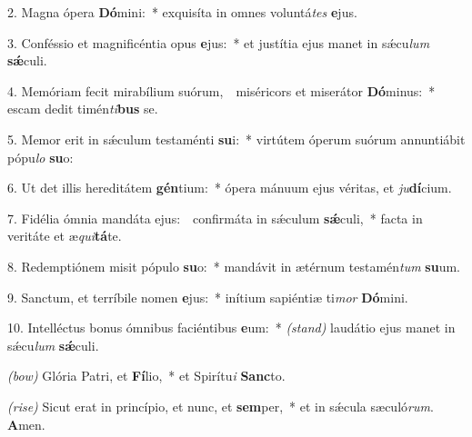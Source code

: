 2. Magna ópera \textbf{Dó}mini:~* exquisíta in omnes voluntá\textit{tes} \textbf{e}jus.

3. Conféssio et magnificéntia opus \textbf{e}jus:~* et justítia ejus manet in s\'{\ae}cu\textit{lum} \textbf{s\'{\ae}}culi.

4. Memóriam fecit mirabílium suórum,~\GreDagger\ miséricors et miserátor \textbf{Dó}minus:~* escam dedit timén\textit{ti}\textbf{bus} se.

5. Memor erit in s\'{\ae}culum testaménti \textbf{su}i:~* virtútem óperum suórum annuntiábit pópu\textit{lo} \textbf{su}o:

6. Ut det illis hereditátem \textbf{gén}ti\-um:~* ópera mánuum ejus véritas, et \textit{ju}\textbf{dí}cium.

7. Fidélia ómnia mandáta ejus:~\GreDagger\ confirmáta in s\'{\ae}culum \textbf{s\'{\ae}}culi,~* facta in veritáte et æ\textit{qui}\textbf{tá}te.

8. Redemptiónem misit pópulo \textbf{su}o:~* mandávit in ætérnum testamén\textit{tum} \textbf{su}um.

9. Sanctum, et terríbile nomen \textbf{e}jus:~* inítium sapiéntiæ ti\textit{mor} \textbf{Dó}\-mini.

10. Intelléctus bonus ómnibus faciéntibus \textbf{e}um:~* {\color{red}\textit{(stand)}} laudátio ejus manet in s\'{\ae}cu\textit{lum} \textbf{s\'{\ae}}culi.

{\color{red}\textit{(bow)}} Glória Patri, et \textbf{Fí}lio,~* et Spirítu\textit{i} \textbf{Sanc}to.

{\color{red}\textit{(rise)}} Sicut erat in princípio, et nunc, et \textbf{sem}per,~* et in s\'{\ae}cula sæculó\textit{rum}. \textbf{A}men.